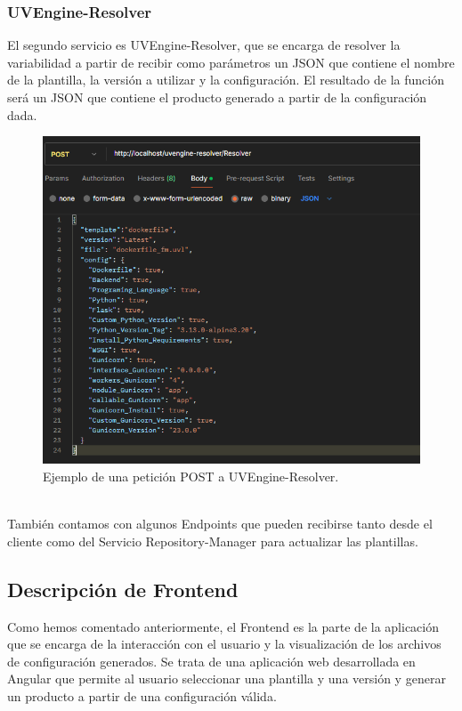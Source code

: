 \documentclass[12pt, a4paper, twoside]{article}
\begin{document}
\newpage
\subsubsection{UVEngine-Resolver}

El segundo servicio es UVEngine-Resolver, que se encarga de resolver la variabilidad a partir de recibir como parámetros un JSON que contiene el nombre de la plantilla, la versión a utilizar y la configuración. 
El resultado de la función será un JSON que contiene el producto generado a partir de la configuración dada. 
\begin{figure}[h]
	\centering
	  \includegraphics[width=1\textwidth]{Peticion POST uvengine-resolver.png}
	\caption{Ejemplo de una petición POST a UVEngine-Resolver.}
\end{figure}
\\
También contamos con algunos Endpoints que pueden recibirse tanto desde el cliente como del Servicio Repository-Manager para actualizar las plantillas.
\newpage
\subsection{Descripción de Frontend}
Como hemos comentado anteriormente, el Frontend es la parte de la aplicación que se encarga de la interacción con el usuario y la visualización de los archivos de configuración generados.
Se trata de una aplicación web desarrollada en Angular que permite al usuario seleccionar una plantilla y una versión y generar un producto a partir de una configuración válida.
\end{document}
